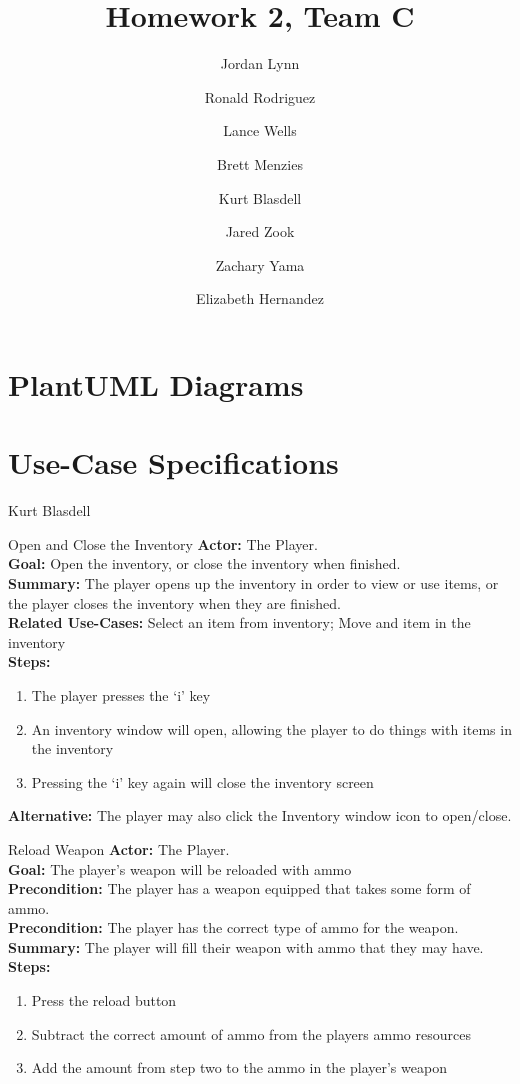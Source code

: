 \documentclass[12pt]{report}
\title{Homework 2, Team C}
\author{ Jordan Lynn 
\and Ronald Rodriguez 
\and Lance Wells 
\and Brett Menzies 
\and Kurt Blasdell 
\and Jared Zook 
\and Zachary Yama
\and Elizabeth Hernandez
}
\begin{document}
    \maketitle

\tableofcontents{}

\chapter{PlantUML Diagrams}

\chapter{Use-Case Specifications}


\begin{section}{Kurt Blasdell}
\begin{subsection}{Open and Close the Inventory}
\textbf{Actor:} The Player. \\
\textbf{Goal:} Open the inventory, or close the inventory when finished. \\
\textbf{Summary:} The player opens up the inventory in order to view or use items, or the player closes the inventory when they are finished. \\
\textbf{Related Use-Cases:} Select an item from inventory; Move and item in the inventory \\
\textbf{Steps:}
\begin{enumerate}
	\item The player presses the ‘i’ key
	\item An inventory window will open, allowing the player to do things with items in the inventory
	\item Pressing the ‘i’ key again will close the inventory screen
\end{enumerate}
\textbf{Alternative:} The player may also click the Inventory window icon to open/close.
\end{subsection}

\begin{subsection}{Reload Weapon}
\textbf{Actor:} The Player. \\
\textbf{Goal:} The player’s weapon will be reloaded with ammo \\
\textbf{Precondition:} The player has a weapon equipped that takes some form of ammo. \\
\textbf{Precondition:} The player has the correct type of ammo for the weapon. \\
\textbf{Summary:} The player will fill their weapon with ammo that they may have. \\
\textbf{Steps:}
\begin{enumerate}
	\item Press the reload button
	\item Subtract the correct amount of ammo from the players ammo resources
	\item Add the amount from step two to the ammo in the player’s weapon
\end{enumerate}
\end{subsection}


\end{section}
\end{document}

